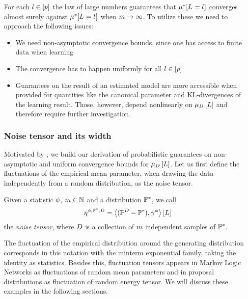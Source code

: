 For each $l\in[p]$ the law of large numbers guarantees that $\mu^*[L_{}=l_{}]$ converges almost surely against $\mu^*[L_{}=l_{}]$ when $m\rightarrow\infty$.
To utilize these we need to approach the following issues:
\begin{itemize}
    \item We need non-asymptotic convergence bounds, since one has access to finite data when learning
    \item The convergence has to happen uniformly for all $l\in[p]$
    \item Guarantees on the result of an estimated model are more accessible when provided for quantities like the canonical parameter and KL-divergences of the learning result.
    Those, however, depend nonlinearly on $\mu_{D}\left[L\right]$ and therefore require further investigation.
\end{itemize}

\subsubsection{Noise tensor and its width}

Motivated by , we build our derivation of probabilistic guarantees on non-asymptotic and uniform convergence bounds for $\mu_{D}\left[L\right]$.
Let us first define the fluctuations of the empirical mean parameter, when drawing the data independently from a random distribution, as the noise tensor.

\begin{definition}
    \label{def:noiseTensor}
    Given a statistic $\phi$, $m\in\mathbb{N}$ and a distribution $\mathbb{P}^*$, we call
    \begin{align*}
        \eta^{\phi,\mathbb{P}^*,D} = \left\langle (\mathbb{P}^{D}-\mathbb{P}^*),\gamma^{\phi}\right\rangle \left[ L \right]
    \end{align*}
    the \emph{noise tensor}, where $D$ is a collection of $m$ independent samples of $\mathbb{P}^*$.
\end{definition}

The fluctuation of the empirical distribution around the generating distribution corresponds in this notation with the minterm exponential family, taking the identity as statistics.
Besides this, fluctuation tensors appears in Markov Logic Networks as fluctuations of random mean parameters and in proposal distributions as fluctuation of random energy tensor.
We will discuss these examples in the following sections.


